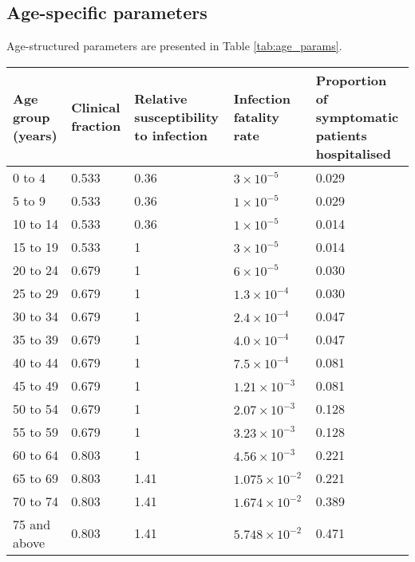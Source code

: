 \subsection{Age-specific parameters}

Age-structured parameters are presented in Table \ref{tab:age_params}.

\begin{table}
    \begin{threeparttable}
    \begin{tabularx}{\textwidth}{| X | X | X | X | X |}
        \hline
        Age group (years) & Clinical fraction\tnote{a} & 
        Relative susceptibility to infection & Infection fatality rate & 
        Proportion of symptomatic patients hospitalised \\
        \hline
        0 to 4 & 0.533 & 0.36 & $3\times10^{-5}$ & 0.029 \\
        \hline
        5 to 9 & 0.533 & 0.36 & $1\times10^{-5}$ & 0.029 \\
        \hline
        10 to 14 & 0.533 & 0.36 & $1\times10^{-5}$ & 0.014 \\
        \hline
        15 to 19 & 0.533 & 1 & $3\times10^{-5}$ & 0.014 \\
        \hline
        20 to 24 & 0.679 & 1 & $6\times10^{-5}$ & 0.030 \\
        \hline
        25 to 29 & 0.679 & 1 & $1.3\times10^{-4}$ & 0.030 \\
        \hline
        30 to 34 & 0.679 & 1 & $2.4\times10^{-4}$ & 0.047 \\
        \hline
        35 to 39 & 0.679 & 1 & $4.0\times10^{-4}$ & 0.047 \\
        \hline
        40 to 44 & 0.679 & 1 & $7.5\times10^{-4}$ & 0.081 \\
        \hline
        45 to 49 & 0.679 & 1 & $1.21\times10^{-3}$ & 0.081 \\
        \hline
        50 to 54 & 0.679 & 1 & $2.07\times10^{-3}$ & 0.128 \\
        \hline
        55 to 59 & 0.679 & 1 & $3.23\times10^{-3}$ & 0.128 \\
        \hline
        60 to 64 & 0.803 & 1 & $4.56\times10^{-3}$ & 0.221 \\
        \hline
        65 to 69 & 0.803 & 1.41 & $1.075\times10^{-2}$ & 0.221 \\
        \hline
        70 to 74 & 0.803 & 1.41 & $1.674\times10^{-2}$ & 0.389 \\
        \hline
        75 and above & 0.803 & 1.41 & $5.748\times10^{-2}$\tnote{b} & 0.471 \\

\end{tabularx}
\end{threeparttable}
\end{table}
